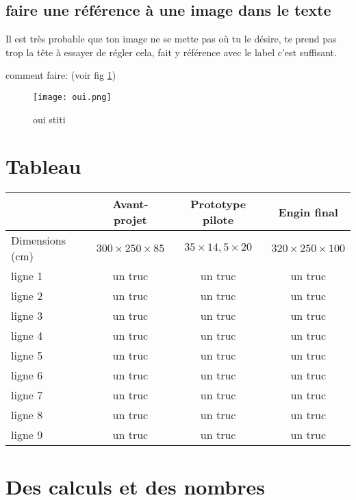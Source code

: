 \documentclass{report}
\begin{document}
\subsection{faire une référence à une image dans le texte}

Il est très probable que ton image ne se mette pas où tu le désire, te prend pas trop la tête à essayer de régler cela, fait y référence avec le label c'est suffisant. 

comment faire: 
 (voir fig \ref{label que tu as écrit dans le code de ton image})

\begin{figure}[!h]
    \centering
    \begin{minipage}[t]{5cm}
        \centering
    \texttt{[image: oui.png]}
    \caption{oui stiti}
    \label{label que tu as écrit dans le code de ton image}
    \end{minipage}
\end{figure}


\section{Tableau}


\begin{center}
\begin{tabular}{|l|c|c|c|}
  \hline
  & Avant-projet & Prototype pilote & Engin final \\
  \hline
  Dimensions (cm) & $300 \times 250 \times 85$ & $35 \times 14,5 \times 20$ & $320 \times 250 \times 100$\\
  ligne 1 & un truc & un truc & un truc \\
  ligne 2 & un truc & un truc & un truc \\
  ligne 3 & un truc & un truc & un truc \\
  ligne 4 & un truc & un truc & un truc \\
  ligne 5 & un truc & un truc & un truc \\
  ligne 6 & un truc & un truc & un truc \\
  ligne 7 & un truc & un truc & un truc \\
  ligne 8 & un truc & un truc & un truc \\
  ligne 9 & un truc & un truc & un truc \\
  \hline
\end{tabular}
\end{center}


\section{Des calculs et des nombres}
\end{document}
